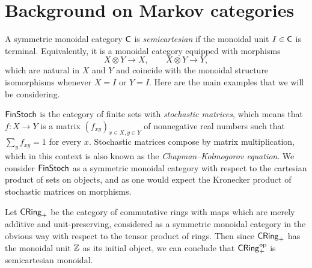 \documentclass[11pt]{article}
\begin{document}
\section{Background on Markov categories}\label{background}

A symmetric monoidal category $\mathsf{C}$ is \emph{semicartesian} if the monoidal unit $I \in \mathsf{C}$ is terminal. Equivalently, it is a monoidal category equipped with morphisms
\[
	X \otimes Y \longrightarrow X, \qquad X \otimes Y \longrightarrow Y,
\]
which are natural in $X$ and $Y$ and coincide with the monoidal structure isomorphisms whenever $X = I$ or $Y = I$. Here are the main examples that we will be considering.

\begin{example}
	\label{finstoch}
	$\operatorname{\mathsf{FinStoch}}$ is the category of finite sets with \emph{stochastic matrices}, which means that $f : X \to Y$ is a matrix $(f_{xy})_{x \in X,y \in Y}$ of nonnegative real numbers such that $\sum_y f_{xy} = 1$ for every $x$. Stochastic matrices compose by matrix multiplication, which in this context is also known as the \emph{Chapman--Kolmogorov equation}. We consider $\operatorname{\mathsf{FinStoch}}$ as a symmetric monoidal category with respect to the cartesian product of sets on objects, and as one would expect the Kronecker product of stochastic matrices on morphisms.
\end{example}

\begin{example}
	\label{cring}
	Let $\operatorname{\mathsf{CRing}}_+$ be the category of commutative rings with maps which are merely additive and unit-preserving, considered as a symmetric monoidal category in the obvious way with respect to the tensor product of rings. Then since $\operatorname{\mathsf{CRing}}_+$ has the monoidal unit $\mathbb{Z}$ as its initial object, we can conclude that $\operatorname{\mathsf{CRing}}_+^{\mathrm{op}}$ is semicartesian monoidal.
\end{example}
\end{document}
